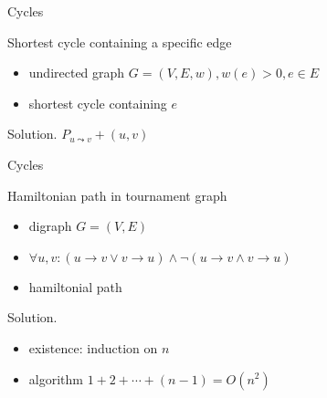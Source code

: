 \begin{frame}{Cycles}
  \begin{exampleblock}{Shortest cycle containing a specific edge }
    \begin{itemize}
      \item undirected graph $G = (V, E, w), w(e) > 0, e \in E$
      \item shortest cycle containing $e$
    \end{itemize}
  \end{exampleblock}

  \begin{block}{Solution.}
    $P_{u \leadsto v} + (u,v)$ 
  \end{block}
\end{frame}
\begin{frame}{Cycles}
  \begin{exampleblock}{Hamiltonian path in tournament graph }
    \begin{itemize}
      \item digraph $G = (V, E)$
      \item $\forall u,v: (u \to v \lor v \to u) \land \lnot (u \to v \land v \to u)$
      \item hamiltonial path
    \end{itemize}
  \end{exampleblock}

  \begin{block}{Solution.}
    \begin{itemize}
      \item existence: induction on $n$
      \item algorithm $1 + 2 + \cdots + (n-1) = O(n^{2})$
    \end{itemize}
  \end{block}
\end{frame}
